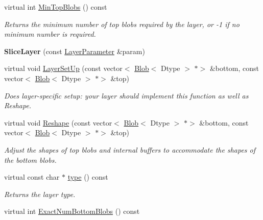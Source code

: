 \begin{DoxyCompactItemize}
virtual int \mbox{\hyperlink{classcaffe_1_1_slice_layer_a2673c06234a234362c1e2592880567a1}{Min\+Top\+Blobs}} () const
\begin{DoxyCompactList}\small\item\em Returns the minimum number of top blobs required by the layer, or -\/1 if no minimum number is required. \end{DoxyCompactList}\item 
\mbox{\label{classcaffe_1_1_slice_layer_a2d4001e14fba5c1e64595f1d1a05c957}} 
{\bfseries Slice\+Layer} (const \mbox{\hyperlink{classcaffe_1_1_layer_parameter}{Layer\+Parameter}} \&param)
\item 
virtual void \mbox{\hyperlink{classcaffe_1_1_slice_layer_a17b30448f94f43b480c5c6393341109b}{Layer\+Set\+Up}} (const vector$<$ \mbox{\hyperlink{classcaffe_1_1_blob}{Blob}}$<$ Dtype $>$ $\ast$$>$ \&bottom, const vector$<$ \mbox{\hyperlink{classcaffe_1_1_blob}{Blob}}$<$ Dtype $>$ $\ast$$>$ \&top)
\begin{DoxyCompactList}\small\item\em Does layer-\/specific setup\+: your layer should implement this function as well as Reshape. \end{DoxyCompactList}\item 
virtual void \mbox{\hyperlink{classcaffe_1_1_slice_layer_ac6fce397efbab95848f56be7b4f6a786}{Reshape}} (const vector$<$ \mbox{\hyperlink{classcaffe_1_1_blob}{Blob}}$<$ Dtype $>$ $\ast$$>$ \&bottom, const vector$<$ \mbox{\hyperlink{classcaffe_1_1_blob}{Blob}}$<$ Dtype $>$ $\ast$$>$ \&top)
\begin{DoxyCompactList}\small\item\em Adjust the shapes of top blobs and internal buffers to accommodate the shapes of the bottom blobs. \end{DoxyCompactList}\item 
\mbox{\label{classcaffe_1_1_slice_layer_a61b1bf3326b7aaa1d984bcb8ce692f43}} 
virtual const char $\ast$ \mbox{\hyperlink{classcaffe_1_1_slice_layer_a61b1bf3326b7aaa1d984bcb8ce692f43}{type}} () const
\begin{DoxyCompactList}\small\item\em Returns the layer type. \end{DoxyCompactList}\item 
virtual int \mbox{\hyperlink{classcaffe_1_1_slice_layer_abfc6e86b0b22c156ddc350168cd7757b}{Exact\+Num\+Bottom\+Blobs}} () const

\end{DoxyCompactItemize}
